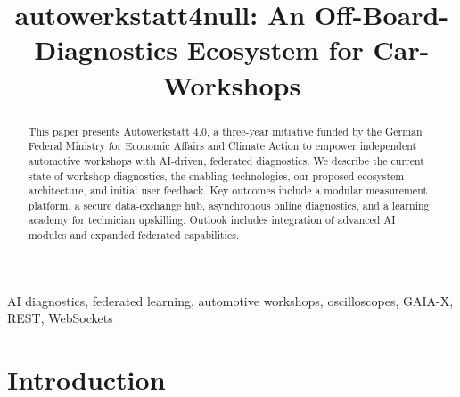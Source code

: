 





\title{autowerkstatt4null: An Off-Board-Diagnostics Ecosystem for Car-Workshops}
\author{%
}

\maketitle

\begin{abstract}
This paper presents Autowerkstatt 4.0, a three-year initiative funded by the German Federal Ministry for Economic Affairs and Climate Action to empower independent automotive workshops with AI-driven, federated diagnostics. 
We describe the current state of workshop diagnostics, the enabling technologies, our proposed ecosystem architecture, and initial user feedback. 
Key outcomes include a modular measurement platform, a secure data-exchange hub, asynchronous online diagnostics, and a learning academy for technician upskilling. 
Outlook includes integration of advanced AI modules and expanded federated capabilities.
\end{abstract}

\begin{IEEEkeywords}
AI diagnostics, federated learning, automotive workshops, oscilloscopes, GAIA-X, REST, WebSockets
\end{IEEEkeywords}

\section{Introduction}

